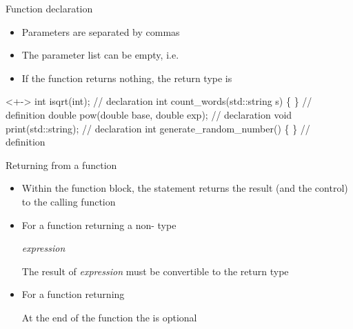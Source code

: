 \begin{frame}[fragile]{Function declaration \insertcontinuationtext}

  \begin{itemize}[<+->]
  \item Parameters are separated by commas

  \item The parameter list can be empty, i.e. \code{()}

  \item If the function returns nothing, the return type is 

  \end{itemize}

  \begin{codeblock}<+->{
int isqrt(int);                        // declaration
int count_words(std::string s) \{ \ddd \}  // definition
double pow(double base, double exp);   // declaration
void print(std::string);               // declaration
int generate_random_number() \{ \ddd \}    // definition}\end{codeblock}

\end{frame}

\begin{frame}[fragile]{Returning from a function}

  \begin{itemize}[<+->]
  \item Within the function block, the \alert{} statement returns
    the result (and the control) to the calling function

  \item For a function returning a non- type

     \textit{expression} \code{;}

    The result of \textit{expression} must be convertible to the return type

  \item For a function returning 


    At the end of the function the  is optional

  \end{itemize}

\end{frame}

